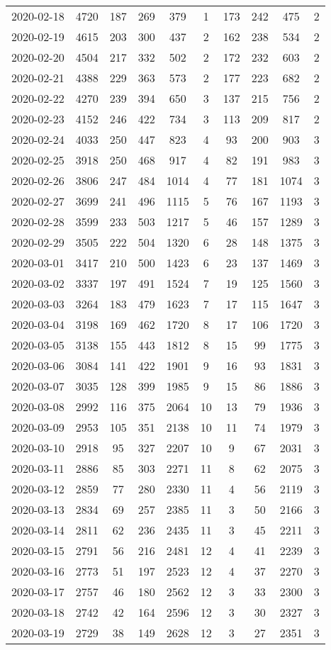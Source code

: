 \begin{longtable}{cccccccccc}
2020-02-18&4720&187&269&379&1&173&242&475&2\\
2020-02-19&4615&203&300&437&2&162&238&534&2\\
2020-02-20&4504&217&332&502&2&172&232&603&2\\
2020-02-21&4388&229&363&573&2&177&223&682&2\\
2020-02-22&4270&239&394&650&3&137&215&756&2\\
2020-02-23&4152&246&422&734&3&113&209&817&2\\
2020-02-24&4033&250&447&823&4&93&200&903&3\\
2020-02-25&3918&250&468&917&4&82&191&983&3\\
2020-02-26&3806&247&484&1014&4&77&181&1074&3\\
2020-02-27&3699&241&496&1115&5&76&167&1193&3\\
2020-02-28&3599&233&503&1217&5&46&157&1289&3\\
2020-02-29&3505&222&504&1320&6&28&148&1375&3\\
2020-03-01&3417&210&500&1423&6&23&137&1469&3\\
2020-03-02&3337&197&491&1524&7&19&125&1560&3\\
2020-03-03&3264&183&479&1623&7&17&115&1647&3\\
2020-03-04&3198&169&462&1720&8&17&106&1720&3\\
2020-03-05&3138&155&443&1812&8&15&99&1775&3\\
2020-03-06&3084&141&422&1901&9&16&93&1831&3\\
2020-03-07&3035&128&399&1985&9&15&86&1886&3\\
2020-03-08&2992&116&375&2064&10&13&79&1936&3\\
2020-03-09&2953&105&351&2138&10&11&74&1979&3\\
2020-03-10&2918&95&327&2207&10&9&67&2031&3\\
2020-03-11&2886&85&303&2271&11&8&62&2075&3\\
2020-03-12&2859&77&280&2330&11&4&56&2119&3\\
2020-03-13&2834&69&257&2385&11&3&50&2166&3\\
2020-03-14&2811&62&236&2435&11&3&45&2211&3\\
2020-03-15&2791&56&216&2481&12&4&41&2239&3\\
2020-03-16&2773&51&197&2523&12&4&37&2270&3\\
2020-03-17&2757&46&180&2562&12&3&33&2300&3\\
2020-03-18&2742&42&164&2596&12&3&30&2327&3\\
2020-03-19&2729&38&149&2628&12&3&27&2351&3\\

\end{longtable}
